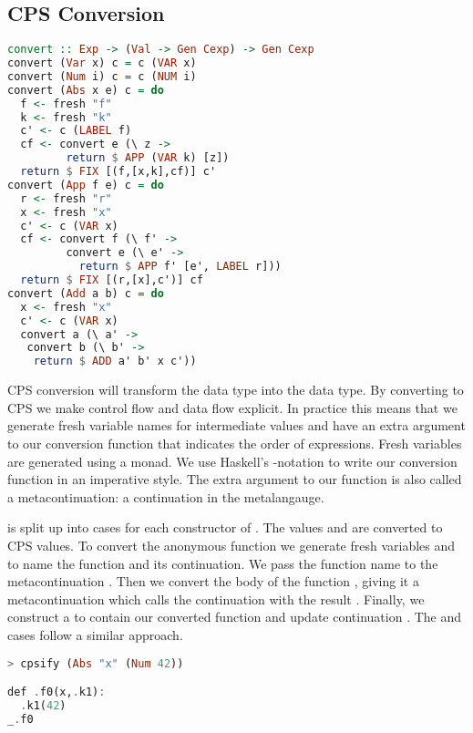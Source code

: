 \subsection{\label{subsection:cpsconvert}CPS Conversion}
\begin{lstlisting}[language=Haskell]
convert :: Exp -> (Val -> Gen Cexp) -> Gen Cexp
convert (Var x) c = c (VAR x)
convert (Num i) c = c (NUM i)
convert (Abs x e) c = do
  f <- fresh "f"
  k <- fresh "k"
  c' <- c (LABEL f)
  cf <- convert e (\ z ->
         return $ APP (VAR k) [z])
  return $ FIX [(f,[x,k],cf)] c'
convert (App f e) c = do
  r <- fresh "r"
  x <- fresh "x"
  c' <- c (VAR x)
  cf <- convert f (\ f' ->
         convert e (\ e' ->
           return $ APP f' [e', LABEL r]))
  return $ FIX [(r,[x],c')] cf
convert (Add a b) c = do
  x <- fresh "x"
  c' <- c (VAR x)
  convert a (\ a' ->
   convert b (\ b' ->
    return $ ADD a' b' x c'))
\end{lstlisting}

\ac{CPS} conversion will transform the  data type into the  data type. By converting to \ac{CPS} we make control flow and data flow explicit. In practice this means that we generate fresh variable names for intermediate values and have an extra argument to our conversion function that indicates the order of expressions. Fresh variables are generated using a monad. We use Haskell's -notation to write our conversion function in an imperative style. The extra argument to our function is also called a metacontinuation: a continuation in the metalangauge.

 is split up into cases for each constructor of . The values  and  are converted to \ac{CPS} values. To convert the anonymous function  we generate fresh variables  and  to name the function and its continuation. We pass the function name to the metacontinuation . Then we convert the body of the function , giving it a metacontinuation which calls the continuation with the result . Finally, we construct a  to contain our converted function and update continuation . The  and  cases follow a similar approach.

\begin{lstlisting}[language=Haskell]
> cpsify (Abs "x" (Num 42))

def .f0(x,.k1):
  .k1(42)
_.f0
\end{lstlisting}

